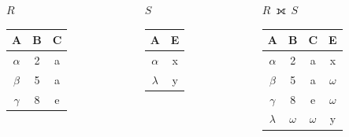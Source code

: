 \documentclass[11pt, handout]{beamer}
\begin{document}
  \begin{frame}
    \begin{columns}[T]
      \begin{column}{0.3\textwidth}
        \centering $R$
        \medskip \\
        \begin{tabular}{|c|c|c|}
          \hline
          \textbf{A} & \textbf{B} & \textbf{C}  \\[0.5ex] \hline\hline
          $\alpha$ & 2 & a\\ \hline
          $\beta$ & 5 & a\\ \hline
          $\gamma$ & 8 & e\\ \hline
        \end{tabular}
      \end{column}
      \begin{column}{0.3\textwidth}
        \centering $S$
        \medskip \\
        \begin{tabular}{|c|c|}
          \hline
          \textbf{A} & \textbf{E} \\[0.5ex] \hline\hline
          $\alpha$ & x\\ \hline
          $\lambda$ & y\\ \hline
        \end{tabular}
      \end{column}
      \begin{column}{0.3\textwidth}
        \centering $R~⟗~S$
        \medskip \\
        \begin{tabular}{|c|c|c|c|}
          \hline
          \textbf{A} & \textbf{B} & \textbf{C} & \textbf{E}\\[0.5ex] \hline\hline
          $\alpha$ & 2 & a & x\\ \hline
          $\beta$ & 5 & a & \cellcolor{blue!25}$\omega$ \\ \hline
          $\gamma$ & 8 & e & \cellcolor{blue!25}$\omega$ \\ \hline
          $\lambda$ & \cellcolor{blue!25}$\omega$ & \cellcolor{blue!25}$\omega$ & y \\ \hline
        \end{tabular}
      \end{column}
    \end{columns}
  \end{frame}
\end{document}

